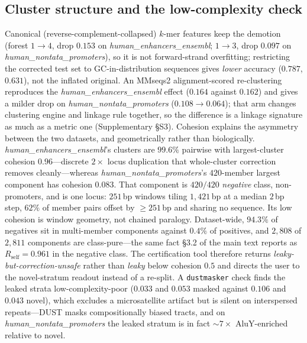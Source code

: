 \documentclass[11pt,a4paper]{article}
\begin{document}
\subsection{Cluster structure and the low-complexity check}\label{sec:s-geo}
Canonical (reverse-complement-collapsed) $k$-mer features keep the demotion (forest $1\to4$, drop $0.153$ on \textit{human\_enhancers\_ensembl}; $1\to3$, drop $0.097$ on \textit{human\_nontata\_promoters}), so it is not forward-strand overfitting; restricting the corrected test set to GC-in-distribution sequences gives \emph{lower} accuracy ($0.787$, $0.631$), not the inflated original. An MMseqs2 alignment-scored re-clustering reproduces the \textit{human\_enhancers\_ensembl} effect ($0.164$ against $0.162$) and gives a milder drop on \textit{human\_nontata\_promoters} ($0.108\to0.064$); that arm changes clustering engine and linkage rule together, so the difference is a linkage signature as much as a metric one (Supplementary \S S3). Cohesion explains the asymmetry between the two datasets, and geometrically rather than biologically. \textit{human\_enhancers\_ensembl}'s clusters are $99.6\%$ pairwise with largest-cluster cohesion $0.96$---discrete $2\times$ locus duplication that whole-cluster correction removes cleanly---whereas \textit{human\_nontata\_promoters}'s $420$-member largest component has cohesion $0.083$. That component is $420/420$ \emph{negative} class, non-promoters, and is one locus: $251$\,bp windows tiling $1{,}421$\,bp at a median $2$\,bp step, $62\%$ of member pairs offset by $\ge251$\,bp and sharing no sequence. Its low cohesion is window geometry, not chained paralogy. Dataset-wide, $94.3\%$ of negatives sit in multi-member components against $0.4\%$ of positives, and $2{,}808$ of $2{,}811$ components are class-pure---the same fact \S3.2 of the main text reports as $R_{\mathrm{self}}=0.961$ in the negative class. The certification tool therefore returns \emph{leaky-but-correction-unsafe} rather than \emph{leaky} below cohesion $0.5$ and directs the user to the novel-stratum readout instead of a re-split. A \texttt{dustmasker} check finds the leaked strata low-complexity-poor ($0.033$ and $0.053$ masked against $0.106$ and $0.043$ novel), which excludes a microsatellite artifact but is silent on interspersed repeats---DUST masks compositionally biased tracts, and on \textit{human\_nontata\_promoters} the leaked stratum is in fact ${\sim}7\times$ AluY-enriched relative to novel.
\end{document}
